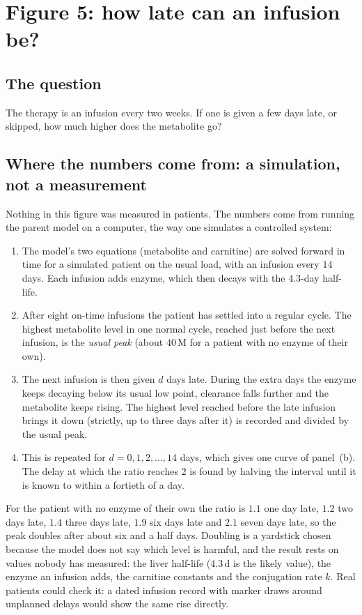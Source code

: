 \documentclass[11pt,a4paper]{article}
\begin{document}
\section{Figure 5: how late can an infusion be?}

\subsection{The question} The therapy is an infusion every two weeks. If one is given a few days
late, or skipped, how much higher does the metabolite go?

\subsection{Where the numbers come from: a simulation, not a measurement} Nothing in this figure
was measured in patients. The numbers come from running the parent model on a computer, the way
one simulates a controlled system:
\begin{enumerate}
\item The model's two equations (metabolite and carnitine) are solved forward in time for a
simulated patient on the usual load, with an infusion every $14$ days. Each infusion adds enzyme,
which then decays with the $4.3$-day half-life.
\item After eight on-time infusions the patient has settled into a regular cycle. The highest
metabolite level in one normal cycle, reached just before the next infusion, is the \emph{usual
peak} (about $40$\,\textmu M for a patient with no enzyme of their own).
\item The next infusion is then given $d$ days late. During the extra days the enzyme keeps
decaying below its usual low point, clearance falls further and the metabolite keeps rising. The
highest level reached before the late infusion brings it down (strictly, up to three days after
it) is recorded and divided by the usual peak.
\item This is repeated for $d=0,1,2,\dots,14$ days, which gives one curve of panel~(b). The delay at
which the ratio reaches $2$ is found by halving the interval until it is known to within a
fortieth of a day.
\end{enumerate}
For the patient with no enzyme of their own the ratio is $1.1$ one day late, $1.2$ two days late,
$1.4$ three days late, $1.9$ six days late and $2.1$ seven days late, so the peak doubles after about
six and a half days. Doubling is a yardstick chosen because the model does not say which level is
harmful, and the result rests on values nobody has measured: the liver half-life ($4.3$\,d is the
likely value), the enzyme an infusion adds, the carnitine constants and the conjugation rate $k$.
Real patients could check it: a dated infusion record with marker draws around unplanned delays
would show the same rise directly.
\end{document}
